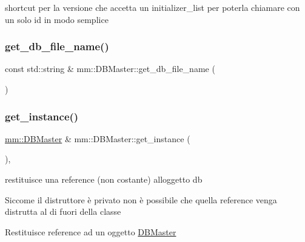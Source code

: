 shortcut per la versione che accetta un initializer\+\_\+list per poterla chiamare con un solo id in modo semplice 

\mbox{\label{classmm_1_1_d_b_master_a65586b91e19e610db40ef1d6e81cfd4a}} 
\subsubsection{\texorpdfstring{get\+\_\+db\+\_\+file\+\_\+name()}{get\_db\_file\_name()}}
{\footnotesize\ttfamily const std\+::string \& mm\+::\+D\+B\+Master\+::get\+\_\+db\+\_\+file\+\_\+name (\begin{DoxyParamCaption}{ }\end{DoxyParamCaption})\hspace{0.3cm}{\ttfamily [static]}}

\mbox{\label{classmm_1_1_d_b_master_a1f3b04e515b1999d3900353c0054f498}} 
\subsubsection{\texorpdfstring{get\+\_\+instance()}{get\_instance()}}
{\footnotesize\ttfamily \mbox{\hyperlink{classmm_1_1_d_b_master}{mm\+::\+D\+B\+Master}} \& mm\+::\+D\+B\+Master\+::get\+\_\+instance (\begin{DoxyParamCaption}{ }\end{DoxyParamCaption})\hspace{0.3cm}{\ttfamily [static]}, {\ttfamily [noexcept]}}



restituisce una reference (non costante) all\textquotesingle{}oggetto db 

Siccome il distruttore è privato non è possibile che quella reference venga distrutta al di fuori della classe

\begin{DoxyReturn}{Restituisce}
reference ad un oggetto \mbox{\hyperlink{classmm_1_1_d_b_master}{D\+B\+Master}} 
\end{DoxyReturn}
\mbox{\label{classmm_1_1_d_b_master_aef9d7063da9d7b4e0fb0a20a6d06368f}} 
